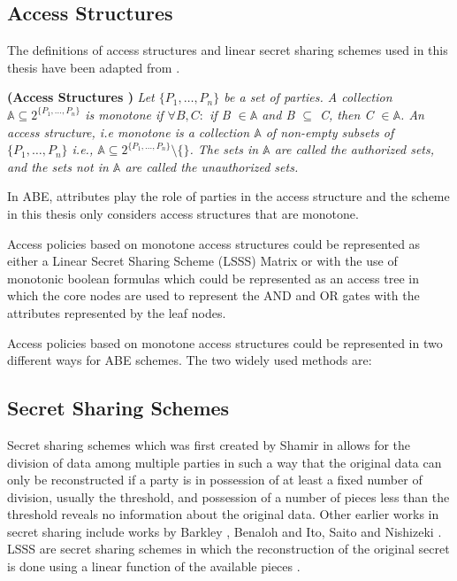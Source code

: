 \subsection*{Access Structures}

The definitions of access structures and linear secret sharing schemes used in this thesis have been adapted from \cite{Beimel1996}.

\begin{definition}{\textbf{(Access Structures \cite{Beimel1996})}}
	\textit{Let $\{P_{1},\ldots,P_{n}\}$ be a set of parties. A collection $ \mathbb{A} \subseteq 2^{\{P_{1},\ldots,P_{n}\}} $ is monotone if $ \forall B,C\colon $ if B $ \in \mathbb{A} $ and B $ \subseteq $ C, then C $ \in \mathbb{A} $. An access structure, i.e monotone is a collection $ \mathbb{A} $ of non-empty subsets of $\{P_{1},\ldots,P_{n}\}$ i.e., $ \mathbb{A} \subseteq 2^{\{P_{1},\ldots,P_{n}\}}\setminus\{\} $. The sets in $ \mathbb{A} $ are called the authorized sets, and the sets not in $ \mathbb{A} $ are called the unauthorized sets.}
\end{definition}

In ABE, attributes play the role of parties in the access structure and the scheme in this thesis only considers access structures that are monotone. 

Access policies based on monotone access structures could be represented as either a Linear Secret Sharing Scheme (LSSS) Matrix or with the use of monotonic boolean formulas which could be represented as an access tree in which the core nodes are used to represent the AND and OR gates with the attributes represented by the leaf nodes. 

Access policies based on monotone access structures could be represented in two different ways for ABE schemes. The two widely used methods are:

\subsection*{Secret Sharing Schemes}

Secret sharing schemes which was first created by Shamir in \cite{Shamir1979} allows for the division of data among multiple parties in such a way that the original data can only be reconstructed if a party is in possession of at least a fixed number of division, usually the threshold, and possession of a number of pieces less than the threshold reveals no information about the original data. Other earlier works in secret sharing include works by Barkley \cite{Blakley1979}, Benaloh \cite{Benaloh1988} and Ito, Saito and Nishizeki \cite{Ito1989}. LSSS are secret sharing schemes in which the reconstruction of the original secret is done using a linear function of the available pieces \cite{Beimel1996}.


